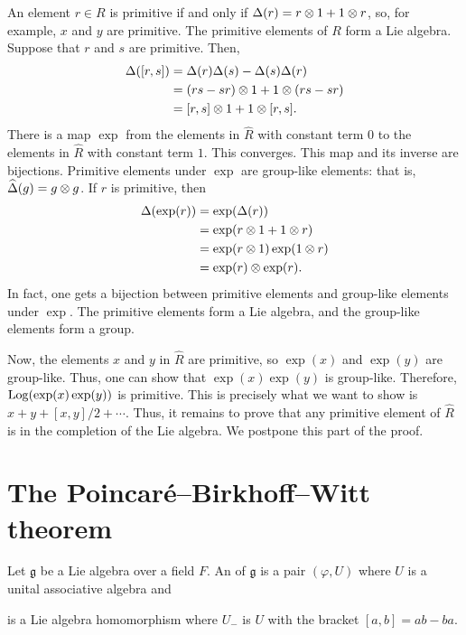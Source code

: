 \documentclass [11 pt, twoside] {article}
\begin{document}
An element $r\in R$ is primitive if and only if $\Delta(r) = r\otimes 1+1\otimes r$, so, for example, $x$ and $y$ are primitive.
The primitive elements of $R$ form a Lie algebra.
Suppose that $r$ and $s$ are primitive. 
Then, 
\begin{align*}
	\Delta([r,s]) &= \Delta (r)\Delta (s)-\Delta (s)\Delta (r)\\
		      &=  (rs-sr)\otimes 1 + 1 \otimes  (rs-sr)\\
		      &= [r,s]\otimes 1 + 1\otimes [r,s].
\end{align*}
There is a map $\exp$ from the elements in $\widehat{R}$ with constant term $0$ to the elements in $\widehat{R}$ with constant term $1$. This converges. This map and its inverse are bijections. 
Primitive elements under $\exp$ are group-like elements: that is, $\widehat{\Delta}(g) = g\otimes g$.
If $r$ is primitive, then
\begin{align*}
	\Delta(\exp(r)) &= \exp(\Delta(r)) \\
			&=\exp(r\otimes 1+1\otimes r)\\
			&= \exp (r\otimes 1)\exp (1\otimes r)\\
			&= \exp (r)\otimes \exp (r).
\end{align*}
In fact, one gets a bijection between primitive elements and group-like elements under $\exp$.
The primitive elements form a Lie algebra, and the group-like elements form a group.

Now, the elements $x$ and $y$ in $\widehat{R}$ are primitive, so $\exp(x)$ and $\exp(y)$ are group-like. Thus, one can show that $\exp(x)\exp (y)$ is group-like.
Therefore, $\operatorname{Log}(\exp(x)\exp (y))$ is primitive. This is precisely what we want to show is $x + y + [x,y]/2+\cdots$.
Thus, it remains to prove that any primitive element of $\widehat{R}$ is in the completion of the Lie algebra. We postpone this part of the proof.




\section {The Poincar\'e--Birkhoff--Witt theorem}
\begin{definition}[ ]\label{}\text{}
Let $\mathfrak{g}$ be a Lie algebra over a field $F$.
An  of $\mathfrak{g}$ is a pair $(\varphi,U)$ where $U$ is a unital associative algebra and 
is a Lie algebra homomorphism where $U_{-}$ is $U$ with the bracket $[a,b] = ab-ba$.
\end{definition}
\end{document}
